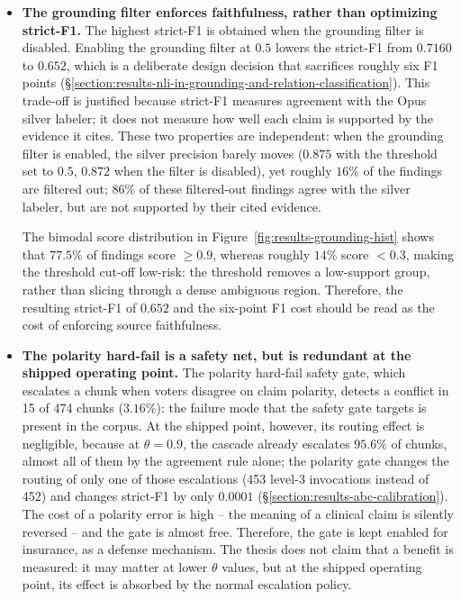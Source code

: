 \begin{itemize}[label={},leftmargin=1.5em]

    \item \textbf{The grounding filter enforces faithfulness, rather than optimizing strict-F1.} The highest strict-F1 is obtained when the grounding filter is disabled. Enabling the grounding filter at $0.5$ lowers the strict-F1 from $0.7160$ to $0.652$, which is a deliberate design decision that sacrifices roughly six F1 points (§\ref{section:results-nli-in-grounding-and-relation-classification}). This trade-off is justified because strict-F1 measures agreement with the Opus silver labeler; it does not measure how well each claim is supported by the evidence it cites. These two properties are independent: when the grounding filter is enabled, the silver precision barely moves ($0.875$ with the threshold set to $0.5$, $0.872$ when the filter is disabled), yet roughly $16\%$ of the findings are filtered out; $86\%$ of these filtered-out findings agree with the silver labeler, but are not supported by their cited evidence. 
    
    The bimodal score distribution in Figure~\ref{fig:results-grounding-hist} shows that $77.5\%$ of findings score $\geq 0.9$, whereas roughly $14\%$ score $<0.3$, making the threshold cut-off low-risk: the threshold removes a low-support group, rather than slicing through a dense ambiguous region. Therefore, the resulting strict-F1 of $0.652$ and the six-point F1 cost should be read as the cost of enforcing source faithfulness.

    \item \textbf{The polarity hard-fail is a safety net, but is redundant at the shipped operating point.} The polarity hard-fail safety gate, which escalates a chunk when voters disagree on claim polarity, detects a conflict in 15 of 474 chunks ($3.16\%$): the failure mode that the safety gate targets is present in the corpus. At the shipped point, however, its routing effect is negligible, because at $\theta=0.9$, the cascade already escalates $95.6\%$ of chunks, almost all of them by the agreement rule alone; the polarity gate changes the routing of only one of those escalations (453 level-3 invocations instead of 452) and changes strict-F1 by only $0.0001$ (§\ref{section:results-abc-calibration}). The cost of a polarity error is high -- the meaning of a clinical claim is silently reversed -- and the gate is almost free. Therefore, the gate is kept enabled for insurance, as a defense mechanism. The thesis does not claim that a benefit is measured: it may matter at lower $\theta$ values, but at the shipped operating point, its effect is absorbed by the normal escalation policy.
    

\end{itemize}
